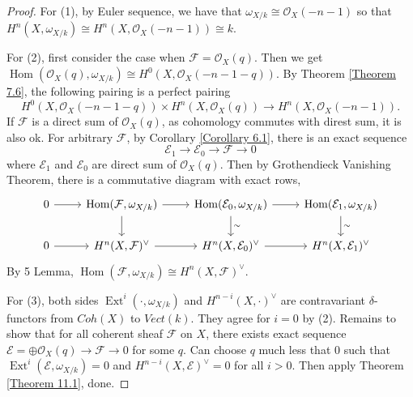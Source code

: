 \documentclass{ctexart}
\renewcommand{\hom}{\operatorname{Hom}}
\newcommand{\ext}{\operatorname{Ext}}
\begin{document}
\begin{proof}
    For (1), by Euler sequence, we have that $\omega_{X/k} \cong \mathcal{O}_{X}(-n - 1)$ so that $H^{n}(X, \omega_{X/k}) \cong H^{n}(X, \mathcal{O}_{X}(-n - 1)) \cong k$.
    \par
    For (2), first consider the case when $\mathcal{F} = \mathcal{O}_{X}(q)$.
    Then we get $\hom(\mathcal{O}_{X}(q), \omega_{X/k}) \cong H^{0}(X, \mathcal{O}_{X}(-n - 1 - q))$.
    By Theorem \ref{Theorem 7.6}, the following pairing is a perfect pairing
    \begin{equation*}
        H^{0}(X, \mathcal{O}_{X}(-n - 1 - q)) \times H^{n}(X, \mathcal{O}_{X}(q)) \longrightarrow H^{n}(X, \mathcal{O}_{X}(-n - 1)).
    \end{equation*}
    If $\mathcal{F}$ is a direct sum of $\mathcal{O}_{X}(q)$, as cohomology commutes with direst sum, it is also ok.
    For arbitrary $\mathcal{F}$, by Corollary \ref{Corollary 6.1}, there is an exact sequence
    \begin{equation*}
        \mathcal{E}_{1} \longrightarrow \mathcal{E}_{0} \longrightarrow \mathcal{F} \longrightarrow 0
    \end{equation*}
    where $\mathcal{E}_{1}$ and $\mathcal{E}_{0}$ are direct sum of $\mathcal{O}_{X}(q)$.
    Then by Grothendieck Vanishing Theorem, there is a commutative diagram with exact rows,
    \begin{equation*}
        \begin{tikzcd}
            0 \arrow[r] &
            \hom(\mathcal{F}, \omega_{X/k}) \arrow[r] \arrow[d] &
            \hom(\mathcal{E}_{0}, \omega_{X/k}) \arrow[r] \arrow[d, "\sim"] &
            \hom(\mathcal{E}_{1}, \omega_{X/k}) \arrow[d, "\sim"] \\
            0 \arrow[r] &
            H^{n}(X, \mathcal{F})^{\lor} \arrow[r] &
            H^{n}(X, \mathcal{E}_{0})^{\lor} \arrow[r] &
            H^{n}(X, \mathcal{E}_{1})^{\lor}
        \end{tikzcd}
    \end{equation*}
    By 5 Lemma, $\hom(\mathcal{F}, \omega_{X/k}) \cong H^{n}(X, \mathcal{F})^{\lor}$.
    \par
    For (3), both sides $\ext^{i}(\cdot, \omega_{X/k})$ and $H^{n - i}(X, \cdot)^{\lor}$ are contravariant $\delta$-functors from $Coh(X)$ to $Vect(k)$.
    They agree for $i = 0$ by (2).
    Remains to show that for all coherent sheaf $\mathcal{F}$ on $X$, there exists exact sequence $\mathcal{E} = \oplus \mathcal{O}_{X}(q) \longrightarrow \mathcal{F} \longrightarrow 0$ for some $q$.
    Can choose $q$ much less that $0$ such that $\ext^{i}(\mathcal{E}, \omega_{X/k}) = 0$ and $H^{n - i}(X, \mathcal{E})^{\lor} = 0$ for all $i > 0$.
    Then apply Theorem \ref{Theorem 11.1}, done.
\end{proof}
\end{document}
